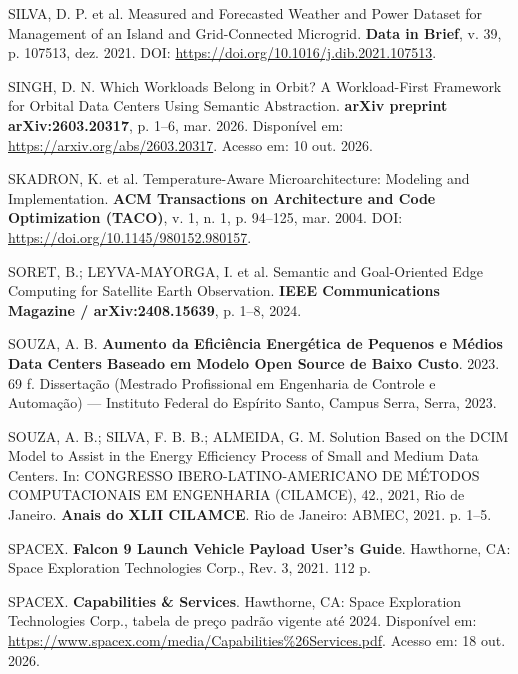 \vspace{0.2cm}
\noindent SILVA, D. P. et al. Measured and Forecasted Weather and Power Dataset for Management of an Island and Grid-Connected Microgrid. \textbf{Data in Brief}, v. 39, p. 107513, dez. 2021. DOI: \url{https://doi.org/10.1016/j.dib.2021.107513}.

\vspace{0.2cm}
\noindent SINGH, D. N. Which Workloads Belong in Orbit? A Workload-First Framework for Orbital Data Centers Using Semantic Abstraction. \textbf{arXiv preprint arXiv:2603.20317}, p. 1--6, mar. 2026. Disponível em: \url{https://arxiv.org/abs/2603.20317}. Acesso em: 10 out. 2026.

\vspace{0.2cm}
\noindent SKADRON, K. et al. Temperature-Aware Microarchitecture: Modeling and Implementation. \textbf{ACM Transactions on Architecture and Code Optimization (TACO)}, v. 1, n. 1, p. 94--125, mar. 2004. DOI: \url{https://doi.org/10.1145/980152.980157}.

\vspace{0.2cm}
\noindent SORET, B.; LEYVA-MAYORGA, I. et al. Semantic and Goal-Oriented Edge Computing for Satellite Earth Observation. \textbf{IEEE Communications Magazine / arXiv:2408.15639}, p. 1--8, 2024.

\vspace{0.2cm}
\noindent SOUZA, A. B. \textbf{Aumento da Eficiência Energética de Pequenos e Médios Data Centers Baseado em Modelo Open Source de Baixo Custo}. 2023. 69 f. Dissertação (Mestrado Profissional em Engenharia de Controle e Automação) --- Instituto Federal do Espírito Santo, Campus Serra, Serra, 2023.

\vspace{0.2cm}
\noindent SOUZA, A. B.; SILVA, F. B. B.; ALMEIDA, G. M. Solution Based on the DCIM Model to Assist in the Energy Efficiency Process of Small and Medium Data Centers. In: CONGRESSO IBERO-LATINO-AMERICANO DE MÉTODOS COMPUTACIONAIS EM ENGENHARIA (CILAMCE), 42., 2021, Rio de Janeiro. \textbf{Anais do XLII CILAMCE}. Rio de Janeiro: ABMEC, 2021. p. 1--5.

\vspace{0.2cm}
\noindent SPACEX. \textbf{Falcon 9 Launch Vehicle Payload User's Guide}. Hawthorne, CA: Space Exploration Technologies Corp., Rev. 3, 2021. 112 p.

\vspace{0.2cm}
\noindent SPACEX. \textbf{Capabilities \& Services}. Hawthorne, CA: Space Exploration Technologies Corp., tabela de preço padrão vigente até 2024. Disponível em: \url{https://www.spacex.com/media/Capabilities%26Services.pdf}. Acesso em: 18 out. 2026.

